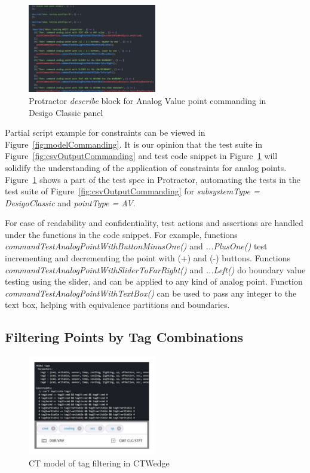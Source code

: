 \documentclass[conference]{IEEEtran}
\begin{document}
	\begin{figure}[!t]
		\includegraphics[width=0.50\textwidth,]{pointCommandingTestCode.pdf}
		\caption{Protractor \textit{describe} block for Analog Value point commanding in Desigo Classic panel}
		\label{fig:pointCommandingTestCode}
	\end{figure}

	Partial script example for constraints can be viewed in Figure~\ref{fig:modelCommanding}. 
	It is our opinion that the test suite in Figure~\ref{fig:csvOutputCommanding} and test code snippet in Figure~\ref{fig:pointCommandingTestCode} will solidify the understanding of the application of constraints for analog points.
	Figure~\ref{fig:pointCommandingTestCode} shows a part of the test spec in Protractor, automating the tests in the test suite of Figure~\ref{fig:csvOutputCommanding} for \textit{subsystemType = DesigoClassic} and \textit{pointType = AV}.
	
	For ease of readability and confidentiality, test actions and assertions are handled under the functions in the code snippet. 
	For example, functions \textit{commandTestAnalogPointWithButtonMinusOne()} and \textit{...PlusOne()} test incrementing and decrementing the point with (+) and (-) buttons.
	Functions \textit{commandTestAnalogPointWithSliderToFarRight()} and \textit{...Left()} do boundary value testing using the slider, and can be applied to any kind of analog point.
	Function \textit{commandTestAnalogPointWithTextBox()} can be used to pass any integer to the text box, helping with equivalence partitions and boundaries.

	\subsection{Filtering Points by Tag Combinations }

	\begin{figure}[!b]
		\includegraphics[width=0.50\textwidth,]{tagFilterModel.pdf}
		\caption{CT model of tag filtering in CTWedge}
		\label{fig:tagFilterModel}
	\end{figure}
\end{document}

